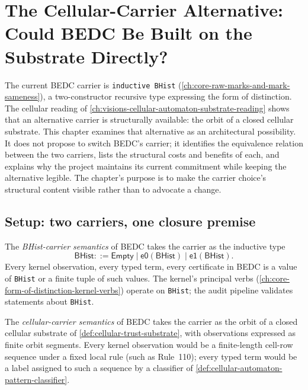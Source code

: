 \chapter{The Cellular-Carrier Alternative: Could BEDC Be Built on the Substrate Directly?}
\label{ch:visions-cellular-substrate-as-carrier-alternative}

The current BEDC carrier is \texttt{inductive BHist} (\autoref{ch:core-raw-marks-and-mark-sameness}), a two-constructor recursive type expressing the form of distinction. The cellular reading of \autoref{ch:visions-cellular-automaton-substrate-reading} shows that an alternative carrier is structurally available: the orbit of a closed cellular substrate. This chapter examines that alternative as an architectural possibility. It does not propose to switch BEDC's carrier; it identifies the equivalence relation between the two carriers, lists the structural costs and benefits of each, and explains why the project maintains its current commitment while keeping the alternative legible. The chapter's purpose is to make the carrier choice's structural content visible rather than to advocate a change.

\section{Setup: two carriers, one closure premise}
\label{sec:cellular-carrier-setup}

\begin{definition}
\label{def:cellular-carrier-bhist-semantics}
The \emph{BHist-carrier semantics} of BEDC takes the carrier as the inductive type
$$
\mathsf{BHist} ::= \mathsf{Empty} \mid \mathsf{e0}(\mathsf{BHist}) \mid \mathsf{e1}(\mathsf{BHist}).
$$
Every kernel observation, every typed term, every certificate in BEDC is a value of \texttt{BHist} or a finite tuple of such values. The kernel's principal verbs (\autoref{ch:core-form-of-distinction-kernel-verbs}) operate on \texttt{BHist}; the audit pipeline validates statements about \texttt{BHist}.
\end{definition}

\begin{definition}
\label{def:cellular-carrier-cellular-semantics}
The \emph{cellular-carrier semantics} of BEDC takes the carrier as the orbit of a closed cellular substrate of \autoref{def:cellular-trust-substrate}, with observations expressed as finite orbit segments. Every kernel observation would be a finite-length cell-row sequence under a fixed local rule (such as Rule~110); every typed term would be a label assigned to such a sequence by a classifier of \autoref{def:cellular-automaton-pattern-classifier}.
\end{definition}


